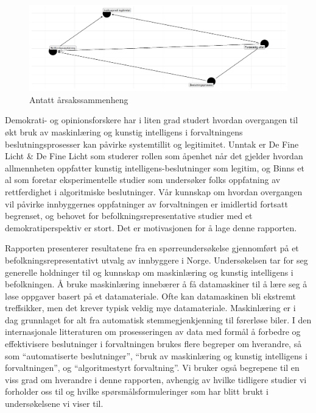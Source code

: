 \documentclass[
  12pt,
  a4paper, 12pt]{article}
\begin{document}
\begin{figure}

{\centering \includegraphics[width=1\linewidth]{figs/png/dag-1} 

}

\caption{Antatt årsakssammenheng}\label{fig:unnamed-chunk-3}
\end{figure}

Demokrati- og opinionsforskere har i liten grad studert hvordan overgangen til økt bruk av maskinlæring og kunstig intelligens i forvaltningens beslutningsprosesser kan påvirke systemtillit og legitimitet.
Unntak er De Fine Licht \& De Fine Licht \citeyearpar{de2020artificial} som studerer rollen som åpenhet når det gjelder hvordan allmennheten oppfatter kunstig intelligens-beslutninger som legitim, og Binns et al \citeyearpar{binns2018s} som foretar eksperimentelle studier som undersøker folks oppfatning av rettferdighet i algoritmiske beslutninger.
Vår kunnskap om hvordan overgangen vil påvirke innbyggernes oppfatninger av forvaltningen er imidlertid fortsatt begrenset, og behovet for befolkningsrepresentative studier med et demokratiperspektiv er stort.
Det er motivasjonen for å lage denne rapporten.

Rapporten presenterer resultatene fra en spørreundersøkelse gjennomført på et befolkningsrepresentativt utvalg av innbyggere i Norge.
Undersøkelsen tar for seg generelle holdninger til og kunnskap om maskinlæring og kunstig intelligens i befolkningen.
Å bruke maskinlæring innebærer å få datamaskiner til å lære seg å løse oppgaver basert på et datamateriale.
Ofte kan datamaskinen bli ekstremt treffsikker, men det krever typisk veldig mye datamateriale.
Maskinlæring er i dag grunnlaget for alt fra automatisk stemmegjenkjenning til førerløse biler.
I den internasjonale litteraturen om prosesseringen av data med formål å forbedre og effektivisere beslutninger i forvaltningen brukes flere begreper om hverandre, så som ``automatiserte beslutninger'', ``bruk av maskinlæring og kunstig intelligens i forvaltningen'', og ``algoritmestyrt forvaltning''.
Vi bruker også begrepene til en viss grad om hverandre i denne rapporten, avhengig av hvilke tidligere studier vi forholder oss til og hvilke spørsmålsformuleringer som har blitt brukt i undersøkelsene vi viser til.
\end{document}
